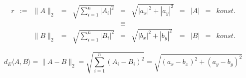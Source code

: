 \clearpage






%


\begin{equation}\label{eq:vektor2norm}
	\begin{aligned}
	r &:= &\|A\|_2 &= &\sqrt{\sum_{i=1}^{n}|A_i|^2} &= &\sqrt{|a_x|^2 + |a_y|^2} &= &|A| &= &konst. \\
	  &&&&&\equiv \\
	  &   &\|B\|_2 &= &\sqrt{\sum_{i=1}^{n}|B_i|^2} &= &\sqrt{|b_x|^2 + |b_y|^2} &= &|B| &= &konst.
	\end{aligned}
\end{equation}




\begin{equation}\label{eq:euklidischerabstand}
	d_E\langle A,B \rangle = \|A - B\|_2 = \sqrt{\sum_{i=1}^{n}(A_i - B_i)^2} = \sqrt{(a_x - b_x)^2 + (a_y - b_y)^2}
\end{equation}


\clearpage

